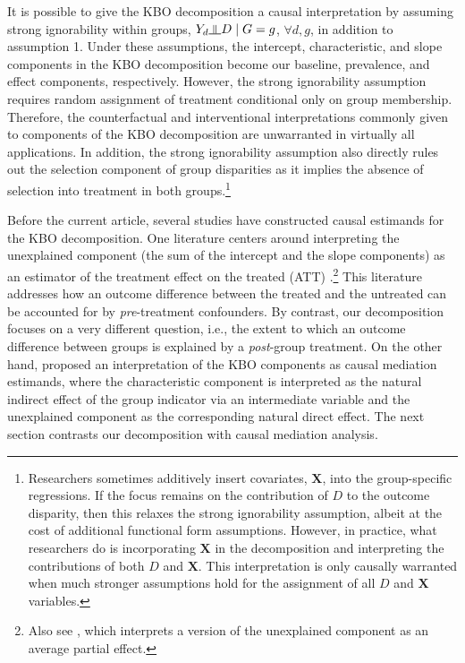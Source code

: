 \documentclass[12pt,a4paper]{article}
\newcommand{\indep}{\rotatebox[origin=c]{90}{$\models$}}  %
\def\X{{\boldsymbol X}}
\begin{document}
It is possible to give the KBO decomposition a causal interpretation by assuming strong ignorability within groups, $Y_d \indep D \mid  G=g$, $\forall d, g$, in addition to assumption 1. Under these assumptions, the intercept, characteristic, and slope components in the KBO decomposition become our baseline, prevalence, and effect components, respectively. However, the strong ignorability assumption requires random assignment of treatment conditional only on group membership. Therefore, the counterfactual and interventional interpretations commonly given to components of the KBO decomposition \citep[e.g.,][]{jann_blinderoaxaca_2008} are unwarranted in virtually all applications. In addition, the strong ignorability assumption also directly rules out the selection component of group disparities as it implies the absence of selection into treatment in both groups.\footnote{Researchers sometimes additively insert covariates, $\X$, into the group-specific regressions. If the focus remains on the contribution of $D$ to the outcome disparity, then this relaxes the strong ignorability assumption, albeit at the cost of additional functional form assumptions. However, in practice, what researchers do is incorporating $\X$ in the decomposition and interpreting the contributions of both $D$ and $\X$. This interpretation is only causally warranted when much stronger assumptions hold for the assignment of all $D$ and $\X$ variables.}

Before the current article, several studies have constructed causal estimands for the KBO decomposition. One literature centers around interpreting the unexplained component (the sum of the intercept and the slope components) as an estimator of the treatment effect on the treated (ATT) \citep{fortin_decomposition_2011, kline_oaxaca-blinder_2011, yamaguchi_decomposition_2015}.\footnote{Also see \citet{chernozhukov_sorted_2018}, which interprets a version of the unexplained component as an average partial effect.} This literature addresses how an outcome difference between the treated and the untreated can be accounted for by \emph{pre}-treatment confounders. By contrast, our decomposition focuses on a very different question, i.e., the extent to which an outcome difference between groups is explained by a \emph{post}-group treatment. On the other hand, \citet{huber_causal_2015} proposed an interpretation of the KBO components as causal mediation estimands, where the characteristic component is interpreted as the natural indirect effect \citep{pearl_direct_2001} of the group indicator via an intermediate variable and the unexplained component as the corresponding natural direct effect. The next section contrasts our decomposition with causal mediation analysis.
\end{document}
